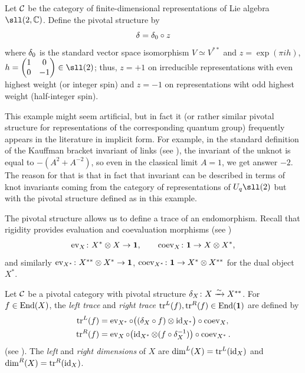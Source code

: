 \begin{example}\label{x:sl2-pivotal}
  Let $\mathcal{C}$ be the category of finite-dimensional representations of Lie
  algebra $\sll(2,\C)$. Define the pivotal structure by
  $$
    \delta=\delta_0\circ z
  $$
  where $\delta_0$ is the standard vector space isomorphism $V\simeq V^{**}$ and
  $z=\exp(\pi i h)$, $h=\begin{pmatrix} 1 & 0\\ 0 &-1\end{pmatrix}\in \sll(2)$;
  thus, $z=+1$ on irreducible representations with even highest weight (or
  integer spin)  and $z=-1$ on representations wiht odd highest weight
  (half-integer spin).

  This example might seem artificial, but in fact it (or rather similar pivotal
  structure for representations of the corresponding quantum group) frequently
  appears in the literature in implicit form. For example, in the standard
  definition of the Kauffman bracket invariant of links (see \cite{kauffman}),
  the invariant of the unknot is equal to $-(A^2+A^{-2})$, so even in the
  classical limit $A=1$, we get answer $-2$. The reason for that is that in
  fact that invariant can be described in terms of knot invariants coming from
  the category of representations of $U_q\sll(2)$ but with the pivotal
  structure defined as in this example.
\end{example}

The pivotal structure allows us to define a trace of an endomorphism. Recall
that rigidity provides evaluation and coevaluation morphisms (see
)
$$
  \operatorname{ev}_X\colon X^*\otimes X\to \mathbf{1},\qquad \operatorname{coev}_X\colon \mathbf{1}\to X\otimes X^*,
$$
and similarly $\operatorname{ev}_{X^*}\colon X^{**}\otimes X^*\to \mathbf{1}$,
$\operatorname{coev}_{X^*}\colon \mathbf{1}\to X^*\otimes X^{**}$ for the dual object $X^*$.

\begin{definition}\label{d:traces}
  Let $\mathcal{C}$ be a pivotal category with pivotal structure $\delta_X\colon X\xrightarrow{\sim}
  X^{**}$. For $f\in \operatorname{End}(X)$, the \emph{left trace} and \emph{right
  trace}
  $\operatorname{tr}^L(f),\operatorname{tr}^R(f)\in \operatorname{End}(\mathbf{1})$ are defined by
  \begin{align*}
    \operatorname{tr}^L(f) &= \operatorname{ev}_{X^*}\circ\bigl((\delta_X\circ f)\otimes \operatorname{id}_{X^*}\bigr)\circ
                \operatorname{coev}_X,\\
    \operatorname{tr}^R(f) &= \operatorname{ev}_X\circ\bigl(\operatorname{id}_{X^*}\otimes (f\circ\delta_X^{-1})\bigr)\circ
                \operatorname{coev}_{X^*}.
  \end{align*}
  (see ).
  The \emph{left} and \emph{right dimensions} of $X$ are
  $\dim^L(X)=\operatorname{tr}^L(\operatorname{id}_X)$ and $\dim^R(X)=\operatorname{tr}^R(\operatorname{id}_X)$.
\end{definition}

